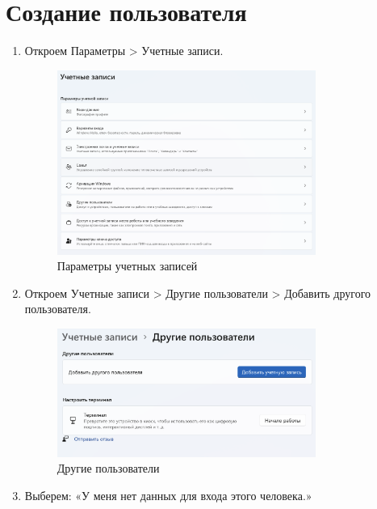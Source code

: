 \documentclass[a4paper, 14pt]{report}
\begin{document}
\section{Создание пользователя}


\begin{enumerate}
    \item {Откроем Параметры > Учетные записи.
          \begin{figure}[H]
              \centering
              \includegraphics[width=0.8\textwidth]{../images/account_settings.png}
              \caption{Параметры учетных записей}
          \end{figure}
          }
    \item {Откроем Учетные записи > Другие пользователи > Добавить другого пользователя.
          \begin{figure}[H]
              \centering
              \includegraphics[width=0.8\textwidth]{../images/other_users.png}
              \caption{Другие пользователи}
          \end{figure}
          }
    \item {Выберем: «У меня нет данных для входа этого человека.»
          \begin{figure}[H]

\end{figure}}
\end{enumerate}
\end{document}
